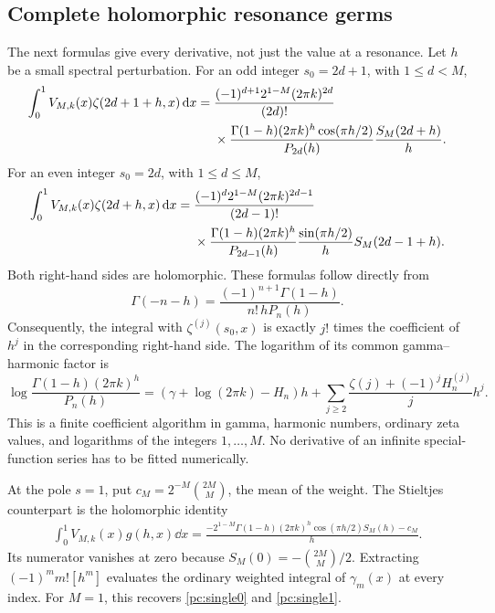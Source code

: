 \subsection{Complete holomorphic resonance germs}
The next formulas give every derivative, not just the value at a resonance. Let $h$ be a small spectral perturbation.
For an odd integer $s_0=2d+1$, with $1\le d<M$,
\begin{align}\label{pc:oddgerm}
 \int_0^1V_{M,k}(x)\zeta(2d+1+h,x)\,\mathrm d x
 ={}&\frac{(-1)^{d+1}2^{1-M}(2\pi k)^{2d}}{(2d)!}\notag\\
 &\times\frac{\Gamma(1-h)(2\pi k)^h\cos(\pi h/2)}{P_{2d}(h)}
             \frac{S_M(2d+h)}h.
\end{align}
For an even integer $s_0=2d$, with $1\le d\le M$,
\begin{align}\label{pc:evengerm}
 \int_0^1V_{M,k}(x)\zeta(2d+h,x)\,\mathrm d x
 ={}&\frac{(-1)^d2^{1-M}(2\pi k)^{2d-1}}{(2d-1)!}\notag\\
 &\times\frac{\Gamma(1-h)(2\pi k)^h}{P_{2d-1}(h)}
          \frac{\sin(\pi h/2)}h S_M(2d-1+h).
\end{align}
Both right-hand sides are holomorphic. These formulas follow directly from
\[
 \Gamma(-n-h)=\frac{(-1)^{n+1}\Gamma(1-h)}{n!\,hP_n(h)}.
\]
Consequently, the integral with $\zeta^{(j)}(s_0,x)$ is exactly $j!$ times the coefficient of $h^j$ in the corresponding right-hand side. The logarithm of its common gamma--harmonic factor is
\begin{equation}\label{pc:jetfactor}
 \log\frac{\Gamma(1-h)(2\pi k)^h}{P_n(h)}
 =(\gamma+\log(2\pi k)-H_n)h
 +\sum_{j\ge2}\frac{\zeta(j)+(-1)^jH_n^{(j)}}j h^j.
\end{equation}
This is a finite coefficient algorithm in gamma, harmonic numbers, ordinary zeta values, and logarithms of the integers $1,\ldots,M$. No derivative of an infinite special-function series has to be fitted numerically.

At the pole $s=1$, put $c_M=2^{-M}\binom{2M}{M}$, the mean of the weight. The Stieltjes counterpart is the holomorphic identity
\begin{align}\label{pc:stieltjesweightedgerm}
 \int_0^1V_{M,k}(x)g(h,x)\dd x
 =\frac{-2^{1-M}\Gamma(1-h)(2\pi k)^h\cos(\pi h/2)S_M(h)-c_M}{h}.
\end{align}
Its numerator vanishes at zero because $S_M(0)=-\binom{2M}{M}/2$. Extracting $(-1)^m m![h^m]$ evaluates the ordinary weighted integral of $\gamma_m(x)$ at every index. For $M=1$, this recovers \eqref{pc:single0} and \eqref{pc:single1}.

